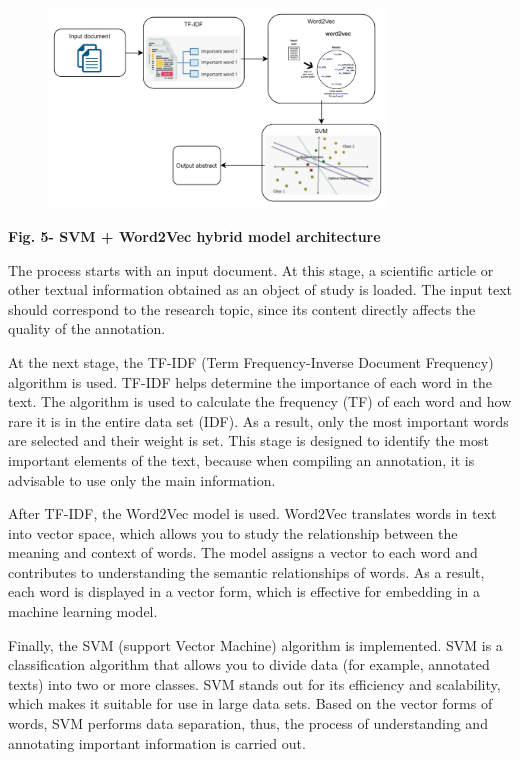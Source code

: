\begin{figure}[H]
	\centering
	\includegraphics[width=0.8\textwidth]{media/ict/image26}
	\caption*{}
\end{figure}


{\bfseries Fig. 5- SVM + Word2Vec hybrid model architecture}

The process starts with an input document. At this stage, a scientific
article or other textual information obtained as an object of study is
loaded. The input text should correspond to the research topic, since
its content directly affects the quality of the annotation.

At the next stage, the TF-IDF (Term Frequency-Inverse Document
Frequency) algorithm is used. TF-IDF helps determine the importance of
each word in the text. The algorithm is used to calculate the frequency
(TF) of each word and how rare it is in the entire data set (IDF). As a
result, only the most important words are selected and their weight is
set. This stage is designed to identify the most important elements of
the text, because when compiling an annotation, it is advisable to use
only the main information.

After TF-IDF, the Word2Vec model is used. Word2Vec translates words in
text into vector space, which allows you to study the relationship
between the meaning and context of words. The model assigns a vector to
each word and contributes to understanding the semantic relationships of
words. As a result, each word is displayed in a vector form, which is
effective for embedding in a machine learning model.

Finally, the SVM (support Vector Machine) algorithm is implemented. SVM
is a classification algorithm that allows you to divide data (for
example, annotated texts) into two or more classes. SVM stands out for
its efficiency and scalability, which makes it suitable for use in large
data sets. Based on the vector forms of words, SVM performs data
separation, thus, the process of understanding and annotating important
information is carried out.

